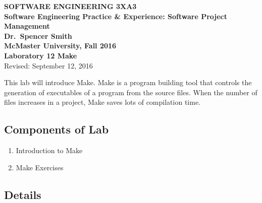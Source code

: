 \documentclass[12pt,fleqn]{article}
\newcommand{\be}{\begin{enumerate}}
\newcommand{\ee}{\end{enumerate}}
\newcommand{\bc}{\begin{center}}
\newcommand{\ec}{\end{center}}
\begin{document}
\bc
{\Large \textbf{SOFTWARE ENGINEERING 3XA3}}\\[2mm]
{\large \textbf{Software Engineering Practice \& Experience: Software Project
Management }}\\[6mm]
{\large \textbf{Dr.~Spencer Smith}}\\[2mm]
{\large \textbf{McMaster University, Fall 2016}}\\[6mm]
{\LARGE \textbf{Laboratory 12 Make}}\\[4mm]
{\large Revised: September 12, 2016}
\ec
\medskip
\noindent
This lab will introduce Make. Make is a program building tool that controls the
generation of executables of a program from the source files. When the number of
files increases in a project, Make saves lots of compilation time.
\subsection*{Components of Lab}

%
%
% 
%
%
%
%
%
\be
\item Introduction to Make
\item Make Exercises
\ee
\subsection*{Details}
\end{document}

